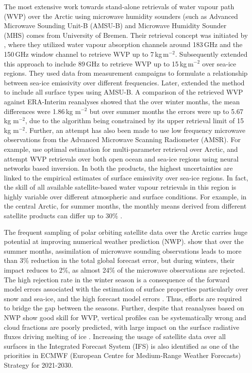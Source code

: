 \documentclass[12pt,oneside,a4paper]{article}
\begin{document}
The most extensive work towards stand-alone retrievals of water vapour path
(WVP) over the Arctic using microwave humidity sounders (such as Advanced
Microwave Sounding Unit-B (AMSU-B) and Microwave Humidity Sounder (MHS) comes
from University of Bremen. Their retrieval concept was initiated by
\citet{miao:2001:atmos}, where they utilized water vapour absorption channels
around 183\,GHz and the 150\,GHz window channel to retrieve WVP up to 7\,kg\,m$^{-2}$. Subsequently \citet{melsheimer:2008:impro} extended this approach to
include 89\,GHz to retrieve WVP up to 15\,kg\,m$^{-2}$ over sea-ice regions.
They used data from measurement campaigns to formulate a relationship between
sea-ice emissivity over different frequencies. Later,
\citet{scarlat:2018:retri} extended the method to include all surface types
using AMSU-B. A comparison of the retrieved WVP against ERA-Interim reanalyses
showed that the over winter months, the mean differences were 1.86\,kg m$^{-2}$
but over summer months the errors were up to 5.67\,kg m$^{-2}$, due to the
algorithm being constrained by its upper retrieval limit of 15\,kg m$^{-2}$.
Further, an attempt has also been made to use low frequency microwave
observations from the Advanced Microwave Scanning Radiometer (AMSR). For example,
\citet{scarlat:2017:exper} use optimal estimation for multi-parameter retrieval
over Arctic, and \citet{zabolotskikh:2020:anadv} attempt WVP retrievals over
both open ocean and sea-ice regions using neural networks based inversion. In
both the products, the highest uncertainties are linked to the empirical
estimates of surface emissivity over sea-ice regions. In fact, the skill of all
available satellite-based water vapour retrievals in this region is highly
variable over different atmospheric and surface conditions. For example, in the
central Arctic, for summer months, the monthly means derived from different
satellite products can differ up to 30\% \citep{crewell:2021:asyst}.

The frequent sampling of polar orbiting satellite data over the Arctic carries
huge potential at improving numerical weather prediction (NWP).
\citet{lawrence:2019:usean} show that over the summer months, assimilation of
microwave sounding observations leads to more than 3\% reduction in the total
global forecast error, but during winters, their impact reduces to 2\%, as
almost 24\% of the microwave observations are rejected. The high rejection rate
in the winter season is a consequence of the forward model errors associated
with the estimation of surface properties particularly over snow and sea-ice,
and the high forecast model errors \citep{bauer:2016:aspec}. Thus, efforts are
required to bridge the gap between the seasons. Further, despite that
reanalyses based on NWP show good skill for WVP, vertical profiles can be
systematically wrong and cloud fractions are poorly predicted, with large
impact on the surface radiative fluxes driving melting of ice
\citep{graham:2019:evalu}. Increasing the usage of satellite data over all
surfaces in the Integrated Forecast System (IFS) is also identified as one of the
priorities in ECMWF (European Centre for Medium-Range Weather Forecasts)
Strategy for 2021-2030.
\end{document}
